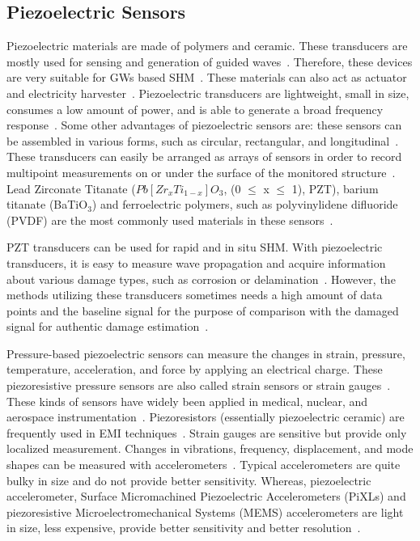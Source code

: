 \documentclass[b5paper, 11pt, titlepage]{book}
\begin{document}
\subsection{Piezoelectric Sensors}
Piezoelectric materials are made of polymers and ceramic. These transducers are mostly used for sensing and generation of guided waves~\cite{dimitriadis1991piezoelectric, Schulz1999, Badcock2000, thomas2017structural}. Therefore, these devices are very suitable for GWs based SHM~\cite{stepinski2013advanced}. These materials can also act as actuator and electricity harvester~\cite{Anton2007}. Piezoelectric transducers are lightweight, small in size, consumes a low amount of power, and is able to generate a broad frequency response~\cite{stepinski2013advanced, su2009identification}. Some other advantages of piezoelectric sensors are: these sensors can be assembled in various forms, such as circular, rectangular, and longitudinal~\cite{stepinski2013advanced, TibaduizaBurgos2020}. These transducers can easily be arranged as arrays of sensors in order to record multipoint measurements on or under the surface of the monitored structure~\cite{Stavroulakis2013}. 
Lead Zirconate Titanate ($Pb[Zr_xTi_{1-x}]O_3$, (0 $\leq$ x $\leq$ 1), PZT), barium titanate (BaTiO$_3$) and ferroelectric polymers, such as polyvinylidene difluoride (PVDF) are the most commonly used materials in these sensors~\cite{kkedziora2013piezoelectric}.

PZT transducers can be used for rapid and in situ SHM. With piezoelectric transducers, it is easy to measure wave propagation and acquire information about various damage types, such as corrosion or delamination~\cite{TibaduizaBurgos2020,Mitra2016}. However, the methods utilizing these transducers sometimes needs a high amount of data points and the baseline signal for the purpose of comparison with the damaged signal for authentic damage estimation~\cite{Farrar2012,Hameed2019}.

Pressure-based piezoelectric sensors can measure the changes in strain, pressure, temperature, acceleration, and force by applying an electrical charge. These piezoresistive pressure sensors are also called strain sensors or strain gauges~\cite{Das2018, Sikarwar2017}. These kinds of sensors have widely  been applied in medical, nuclear, and aerospace instrumentation~\cite{Sikarwar2017}. Piezoresistors (essentially piezoelectric ceramic) are frequently used in EMI techniques~\cite{TibaduizaBurgos2020, jawaid2018structural}. Strain gauges are sensitive but provide only localized measurement. Changes in vibrations, frequency, displacement, and mode shapes can be measured with accelerometers~\cite{Salawu1997}. Typical accelerometers are quite bulky in size and do not provide better sensitivity. Whereas, piezoelectric accelerometer,  Surface Micromachined Piezoelectric Accelerometers (PiXLs) and piezoresistive Microelectromechanical Systems (MEMS) accelerometers are light in size, less expensive, provide  better sensitivity and better resolution~\cite{Das2018, Nemirovsky1996, DeVoe2001, Sabato2017}.    
\end{document}
